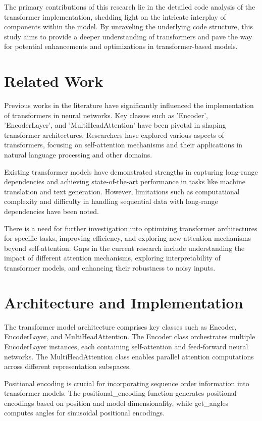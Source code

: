 \documentclass[a4paper,11pt]{article}
\begin{document}
The primary contributions of this research lie in the detailed code analysis of the transformer implementation, shedding light on the intricate interplay of components within the model. By unraveling the underlying code structure, this study aims to provide a deeper understanding of transformers and pave the way for potential enhancements and optimizations in transformer-based models.

\section{Related Work}
Previous works in the literature have significantly influenced the implementation of transformers in neural networks. Key classes such as 'Encoder', 'EncoderLayer', and 'MultiHeadAttention' have been pivotal in shaping transformer architectures. Researchers have explored various aspects of transformers, focusing on self-attention mechanisms and their applications in natural language processing and other domains.

Existing transformer models have demonstrated strengths in capturing long-range dependencies and achieving state-of-the-art performance in tasks like machine translation and text generation. However, limitations such as computational complexity and difficulty in handling sequential data with long-range dependencies have been noted. 

There is a need for further investigation into optimizing transformer architectures for specific tasks, improving efficiency, and exploring new attention mechanisms beyond self-attention. Gaps in the current research include understanding the impact of different attention mechanisms, exploring interpretability of transformer models, and enhancing their robustness to noisy inputs.

\section{Architecture and Implementation}
The transformer model architecture comprises key classes such as Encoder, EncoderLayer, and MultiHeadAttention. The Encoder class orchestrates multiple EncoderLayer instances, each containing self-attention and feed-forward neural networks. The MultiHeadAttention class enables parallel attention computations across different representation subspaces.

Positional encoding is crucial for incorporating sequence order information into transformer models. The positional\_encoding function generates positional encodings based on position and model dimensionality, while get\_angles computes angles for sinusoidal positional encodings.
\end{document}
